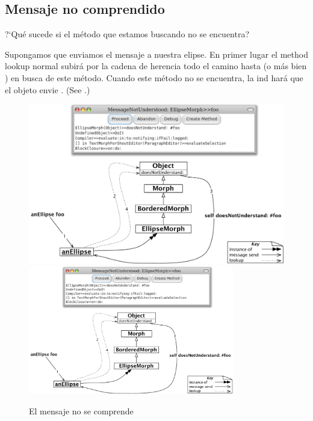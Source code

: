 \documentclass[a4paper,10pt,twoside]{book}
\begin{document}
\subsection{Mensaje no comprendido}

?`Qu\'e sucede si el m\'etodo que estamos buscando no se encuentra?

Supongamos que enviamos el mensaje  a nuestra elipse.
En primer lugar el method lookup normal subir\'a por la cadena de herencia todo el camino hasta  (o m\'as bien ) en busca de este m\'etodo.
Cuando este m\'etodo no se encuentra, la ind  har\'a que el objeto envie .
(See .)

\begin{figure}[htb]
\begin{center}
\ifluluelse
	{\includegraphics[width=\textwidth]{fooNotFound}}
	{\includegraphics[width=0.8\textwidth]{fooNotFound}}
\caption{El mensaje  no se comprende}
\end{center}
\end{figure}
\end{document}
